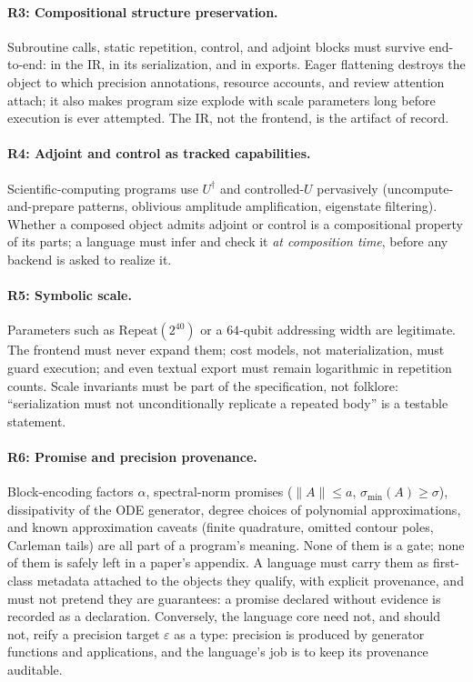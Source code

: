 \paragraph{R3: Compositional structure preservation.}
Subroutine calls, static repetition, control, and adjoint blocks must survive
end-to-end: in the IR, in its serialization, and in exports.  Eager flattening
destroys the object to which precision annotations, resource accounts, and
review attention attach; it also makes program size explode with scale
parameters long before execution is ever attempted.  The IR, not the
frontend, is the artifact of record.

\paragraph{R4: Adjoint and control as tracked capabilities.}
Scientific-computing programs use $U^{\dagger}$ and controlled-$U$ pervasively
(uncompute-and-prepare patterns, oblivious amplitude amplification,
eigenstate filtering).  Whether a composed object admits adjoint or control
is a compositional property of its parts; a language must infer and check it
\emph{at composition time}, before any backend is asked to realize it.

\paragraph{R5: Symbolic scale.}
Parameters such as $\mathrm{Repeat}(2^{40})$ or a $64$-qubit addressing width
are legitimate.  The frontend must never expand them; cost models, not
materialization, must guard execution; and even textual export must remain
logarithmic in repetition counts.  Scale invariants must be part of the
specification, not folklore: ``serialization must not unconditionally
replicate a repeated body'' is a testable statement.

\paragraph{R6: Promise and precision provenance.}
Block-encoding factors $\alpha$, spectral-norm promises
($\|A\|\le a$, $\sigma_{\min}(A)\ge\sigma$), dissipativity of
the ODE generator, degree choices of polynomial approximations, and known
approximation caveats (finite quadrature, omitted contour poles, Carleman
tails) are all part of a program's meaning.  None of them is a gate; none of
them is safely left in a paper's appendix.  A language must carry them as
first-class metadata attached to the objects they qualify, with explicit
provenance, and must not pretend they are guarantees: a promise declared
without evidence is recorded as a declaration.  Conversely, the language
core need not, and should not, reify a precision target $\varepsilon$ as a
type: precision is produced by generator functions and applications, and the
language's job is to keep its provenance auditable.

